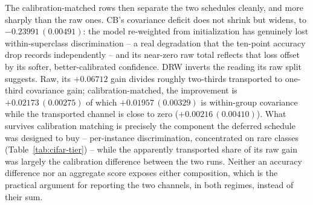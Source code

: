 \documentclass[preprint,times,10pt,a4paper]{elsarticle}
\theoremstyle{plain}
\theoremstyle{definition}
\begin{document}
The calibration-matched rows then separate the two schedules cleanly, and more sharply
than the raw ones. CB's covariance deficit does not shrink but widens, to
$-0.23991\,(0.00491)$: the model re-weighted from initialization has genuinely lost
within-superclass discrimination -- a real degradation that the ten-point accuracy drop
records independently -- and its near-zero raw total reflects that loss offset by its
softer, better-calibrated confidence. DRW inverts the reading its raw split suggests.
Raw, its $+0.06712$ gain divides roughly two-thirds transported to one-third covariance gain;
calibration-matched, the improvement is $+0.02173\,(0.00275)$ of which
$+0.01957\,(0.00329)$ is within-group covariance while the transported channel is close to zero
($+0.00216\,(0.00410)$). What survives calibration matching is precisely the component
the deferred schedule was designed to buy -- per-instance discrimination, concentrated
on rare classes (Table~\ref{tab:cifar-tier}) -- while the apparently transported
share of its raw gain was largely the calibration difference between the two runs.
Neither an accuracy difference nor an aggregate score exposes either composition, which
is the practical argument for reporting the two channels, in both regimes, instead of
their sum.

\begin{table}[t]
\centering
\caption{Raw and calibration-matched decompositions on CIFAR-100-LT at the superclass
audit. Temperatures are fitted by likelihood on a held-out calibration half of the test
split; every decomposition uses the disjoint audit half; entries are means (sd) over
twenty random splits. The final row is the control: recalibrating the baseline alone
carries no instance information yet moves both channels substantially.}
\label{tab:cifar-cal}
\end{table}
\end{document}
